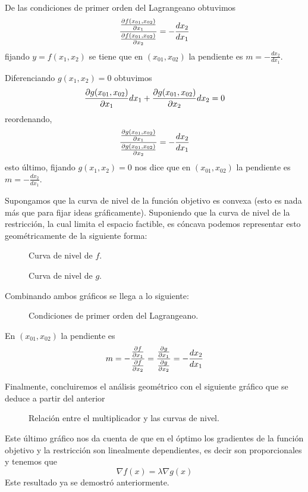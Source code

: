 De las condiciones de primer orden del Lagrangeano obtuvimos
$$\frac{\frac{\partial f(x_{01},x_{02})}{\partial x_1}}{\frac{\partial f(x_{01},x_{02})}{\partial x_2}} = -\frac{dx_2}{dx_1}$$
fijando $y=f(x_1,x_2)$ se tiene que en $(x_{01},x_{02})$ la pendiente es $m = -\displaystyle \frac{dx_2}{dx_1}$. 

Diferenciando $g(x_1,x_2)=0$ obtuvimos
$$\frac{\partial g(x_{01},x_{02})}{\partial x_1}dx_1 + \frac{\partial g(x_{01},x_{02})}{\partial x_2}dx_2 = 0$$
reordenando,
$$\frac{\frac{\partial g(x_{01},x_{02})}{\partial x_1}}{\frac{\partial g(x_{01},x_{02})}{\partial x_2}} = -\frac{dx_2}{dx_1}$$
esto \'ultimo, fijando $g(x_1,x_2)=0$ nos dice que en $(x_{01},x_{02})$ la pendiente es $m = -\displaystyle \frac{dx_2}{dx_1}$. 

Supongamos que la curva de nivel de la funci\'on objetivo es convexa (esto es nada m\'as que para fijar ideas gr\'aficamente). Suponiendo que la curva de nivel de la restricci\'on, la cual limita el espacio factible, es c\'oncava podemos representar esto geom\'etricamente de la siguiente forma:
\begin{figure}[H]
\begin{minipage}[t]{.45\textwidth}
	\centering
	
	\caption{Curva de nivel de $f$.}
\end{minipage}
\hfill
\begin{minipage}[t]{.45\textwidth}
	\centering
	
	\caption{Curva de nivel de $g$.}
\end{minipage}
\end{figure}

Combinando ambos gr\'aficos se llega a lo siguiente:
\begin{figure}[H]
	\centering
	
	\caption{Condiciones de primer orden del Lagrangeano.}
\end{figure}

En $(x_{01},x_{02})$ la pendiente es 
$$m = -\displaystyle \frac{\frac{\partial f}{\partial x_1}}{\frac{\partial f}{\partial x_2}}=\frac{\frac{\partial g}{\partial x_1}}{\frac{\partial g}{\partial x_2}}=-\displaystyle \frac{dx_2}{dx_1}$$

Finalmente, concluiremos el an\'alisis geom\'etrico con el siguiente gr\'afico que se deduce a partir del anterior
\begin{figure}[H]
	\centering
	
	\caption{Relaci\'on entre el multiplicador y las curvas de nivel.}
\end{figure}
Este \'ultimo gr\'afico nos da cuenta de que en el \'optimo los gradientes de la funci\'on objetivo y la restricci\'on son linealmente dependientes, es decir son proporcionales y tenemos que 
$$\nabla f(x) = \lambda \nabla g(x)$$
Este resultado ya se demostr\'o anteriormente.

